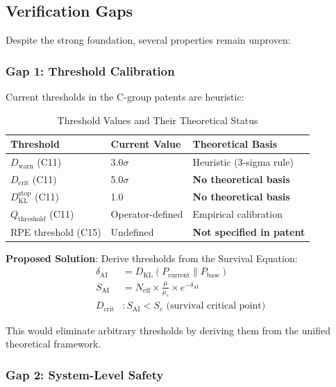 \documentclass[11pt,a4paper]{article}
\newcommand{\Neff}{N_{\text{eff}}}
\newcommand{\Sai}{S_{\text{AI}}}
\newcommand{\muc}{\mu_c}
\newcommand{\DKL}{D_{\text{KL}}}
\begin{document}
\subsection{Verification Gaps}
\label{subsec:gaps}

Despite the strong foundation, several properties remain unproven:

\subsubsection{Gap 1: Threshold Calibration}

Current thresholds in the C-group patents are heuristic:

\begin{table}[htbp]
\centering
\caption{Threshold Values and Their Theoretical Status}
\label{tab:thresholds}
\begin{tabular}{@{}lll@{}}
\toprule
Threshold & Current Value & Theoretical Basis \\
\midrule
$D_{\text{warn}}$ (C11) & 3.0$\sigma$ & Heuristic (3-sigma rule) \\
$D_{\text{crit}}$ (C11) & 5.0$\sigma$ & \textbf{No theoretical basis} \\
$\DKL^{\text{stop}}$ (C11) & 1.0 & \textbf{No theoretical basis} \\
$Q_{\text{threshold}}$ (C11) & Operator-defined & Empirical calibration \\
RPE threshold (C15) & Undefined & \textbf{Not specified in patent} \\
\bottomrule
\end{tabular}
\end{table}

\textbf{Proposed Solution}: Derive thresholds from the Survival Equation:
\begin{align}
\delta_{\text{AI}} &= \DKL(P_{\text{current}} \| P_{\text{base}}) \\
\Sai &= \Neff \times \frac{\mu}{\muc} \times e^{-\delta_{\text{AI}}} \\
D_{\text{crit}} &: \Sai < S_c \text{ (survival critical point)}
\end{align}

This would eliminate arbitrary thresholds by deriving them from the unified theoretical framework.

\subsubsection{Gap 2: System-Level Safety}
\end{document}
